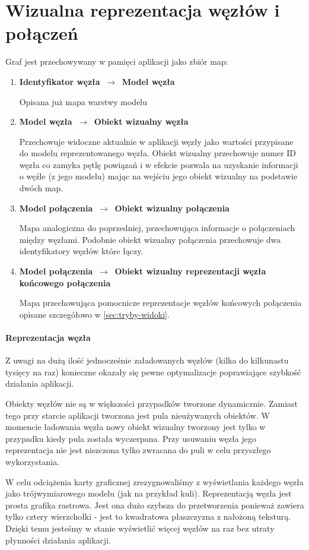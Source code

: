 \section{Wizualna reprezentacja węzłów i połączeń}
\label{sec:graf-reprezentacja}
\newcommand\mapitem[3]{
	\item \textbf{#1 $\,\to\,$ #2}

	#3
}

\noindent
Graf jest przechowywany w pamięci aplikacji jako zbiór map:
\begin{enumerate}[label=\textbullet]
	\mapitem{Identyfikator węzła}{Model węzła}{Opisana już mapa warstwy modelu}
	\mapitem{Model węzła}{Obiekt wizualny węzła}{Przechowuje widoczne aktualnie w aplikacji węzły jako wartości przypisane do modelu reprezentowanego węzła. Obiekt wizualny przechowuje numer ID węzła co zamyka pętlę powiązań i w efekcie pozwala na uzyskanie informacji o węźle (z jego modelu) mając na wejściu jego obiekt wizualny na podstawie dwóch map.}
	\mapitem{Model połączenia}{Obiekt wizualny połączenia}{Mapa analogiczna do poprzedniej, przechowująca informacje o połączeniach między węzłami. Podobnie obiekt wizualny połączenia przechowuje dwa identyfikatory węzłów które łączy.}
	
	\mapitem{Model połączenia}{Obiekt wizualny reprezentacji węzła końcowego połączenia}{Mapa przechowująca pomocnicze reprezentacje węzłów końcowych połączenia opisane szczegółowo w \ref{sec:tryby-widoki}.}
\end{enumerate}

\paragraph{Reprezentacja węzła} Z uwagi na dużą ilość jednocześnie załadowanych węzłów (kilka do kilkunastu tysięcy na raz) konieczne okazały się pewne optymalizacje poprawiające szybkość działania aplikacji. 

Obiekty węzłów nie są w większości przypadków tworzone dynamicznie. Zamiast tego przy starcie aplikacji tworzona jest pula nieużywanych obiektów. W momencie ładowania węzła nowy obiekt wizualny tworzony jest tylko w przypadku kiedy pula została wyczerpana. Przy usuwaniu węzła jego reprezentacja nie jest niszczona tylko zwracana do puli w celu przyszłego wykorzystania.

W celu odciążenia karty graficznej zrezygnowaliśmy z wyświetlania każdego węzła jako trójwymiarowego modelu (jak na przykład kuli). Reprezentacją węzła jest prosta grafika rastrowa. Jest ona dużo szybsza do przetworzenia ponieważ zawiera tylko cztery wierzchołki - jest to kwadratowa płaszczyzna z nałożoną teksturą. Dzięki temu jesteśmy w stanie wyświetlić więcej węzłów na raz bez utraty płynności działania aplikacji.

